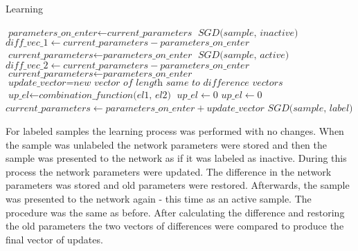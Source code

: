 \documentclass[a4paper,10pt]{report}
\begin{document}
      \begin{algorithm}
      \caption{Learning}\label{euclid}
      \begin{algorithmic}[1]
	\State $\textit{parameters\_on\_enter} \gets \textit{current\_parameters}$
	\State
	\State $\textit{SGD(sample, inactive)}$
	\State $\textit{diff\_vec\_1} \gets \textit{current\_parameters} -\textit{parameters\_on\_enter}$
	\State $\textit{current\_parameters} \gets \textit{parameters\_on\_enter}$
	\State
	\State $\textit{SGD(sample, active)}$
	\State $\textit{diff\_vec\_2} \gets \textit{current\_parameters} - \textit{parameters\_on\_enter}$
	\State $\textit{current\_parameters} \gets \textit{parameters\_on\_enter}$
	\State
	\State $\textit{update\_vector} = \textit{new vector of length same to difference vectors}$
	    \State $\textit{up\_el} \gets \textit{combination\_function(el1, el2)}$
	  \Else
	    \State $\textit{up\_el} \gets 0$
	  \EndIf
	\EndFor
	\State
	    \State $\textit{up\_el} \gets 0$
	  \EndIf
	\EndFor
	\State
	\State $\textit{current\_parameters} \gets \textit{parameters\_on\_enter} + \textit{update\_vector}$
	\Else
	\State $\textit{SGD(sample, label)}$
      \EndIf
      \State
      \EndProcedure
      \end{algorithmic}
      \end{algorithm}
      
      For labeled samples the learning process was performed with no changes. When the sample was unlabeled the network parameters were stored and then the sample was presented to the network as if it was labeled as inactive. During this process the network parameters were updated. The difference in the network parameters was stored and old parameters were restored. Afterwards, the sample was presented to the network again - this time as an active sample. The procedure was the same as before. After calculating the difference and restoring the old parameters the two vectors of differences were compared to produce the final vector of updates. 
           
\end{document}
